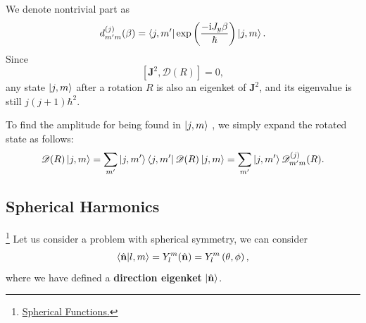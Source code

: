 \documentclass{article}
\theoremstyle{1}
\newcommand{\ii}{\mathrm{i}}
\begin{document}
We denote nontrivial part as 
\begin{equation}
    d^{(j)}_{m'm}(\beta)=\bra{j,m'}\exp\left(\frac{-\ii J_y \beta}{\hbar}\right)\ket{j,m}.
\end{equation}
Since 
\begin{equation}
    \left[\mathbf{J}^2,\mathscr{D}(R)\right]=0,
\end{equation}
any state $\ket{j,m}$ after a rotation $R$ is also an eigenket of $\mathbf{J}^2$, and its eigenvalue is still $j(j+1)\hbar^2$.

To find the amplitude for being found in $\ket{j,m}$ , we simply expand the rotated state as follows:
\begin{equation}
    \mathscr{D}(R)\ket{j,m}=\sum_{m'}\ket{j,m'}\bra{j,m'}\mathscr{D}(R)\ket{j,m}=\sum_{m'}\ket{j,m'}\mathscr{D}^{(j)}_{m'm}(R).
\end{equation}


\subsection{Spherical Harmonics}
\footnote{\href{run:Spherical Functions.pdf alias}{Spherical Functions.}}
Let us consider a problem with spherical symmetry, we can consider
\begin{equation}
    \bra{\hat{\mathbf{n}}}\ket{l,m}=Y_l^m(\hat{\mathbf{n}})=Y_l^m\left(\theta,\phi\right),
\end{equation}
where we have defined a \textbf{direction eigenket} $\ket{\hat{\mathbf{n}}}$.
\end{document}
